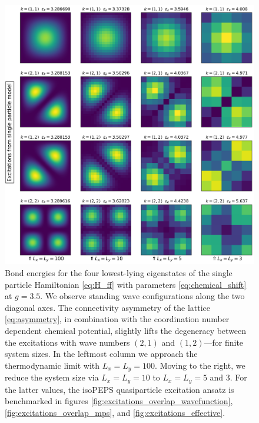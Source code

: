 \newpage
\begin{figure}[H]
  \centering
  \includegraphics[width=\linewidth]{excitations_3.5_single_particle.png}
  \caption{Bond energies for the four lowest-lying eigenstates of the single particle Hamiltonian \eqref{eq:H_ff} with parameters \eqref{eq:chemical_shift} at $g = 3.5$. We observe standing wave configurations along the two diagonal axes. The connectivity asymmetry of the lattice \eqref{eq:asymmetry}, in combination with the coordination number dependent chemical potential, slightly lifts the degeneracy between the excitations with wave numbers $(2, 1)$ and $(1, 2)$---for finite system sizes. In the leftmost column we approach the thermodynamic limit with $L_x = L_y = 100$. Moving to the right, we reduce the system size via $L_x = L_y = 10$ to $L_x = L_y = 5$ and $3$. For the latter values, the isoPEPS quasiparticle excitation ansatz is benchmarked in figures \ref{fig:excitations_overlap_wavefunction}, \ref{fig:excitations_overlap_mps}, and \ref{fig:excitations_effective}.}
 \label{fig:single_particle}
\end{figure}

